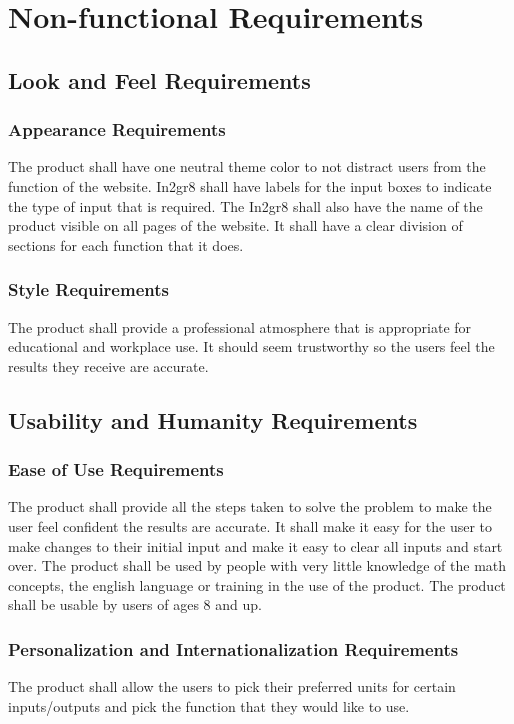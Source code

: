 \documentclass[11pt, oneside]{article}
\begin{document}
\newpage
\section{Non-functional Requirements}
\subsection{Look and Feel Requirements}
\subsubsection{Appearance Requirements}
The product shall have one neutral theme color to not distract users from the function of the website. In2gr8 shall have labels for the input boxes to indicate the type of input that is required. The In2gr8 shall also have the name of the product visible on all pages of the website. It shall have a clear division of sections for each function that it does.




\subsubsection{Style Requirements}
The product shall provide a professional atmosphere that is appropriate for educational and workplace use. It should seem trustworthy so the users feel the results they receive are accurate.




\subsection{Usability and Humanity Requirements}
\subsubsection{Ease of Use Requirements}
The product shall provide all the steps taken to solve the problem to make the user feel confident the results are accurate. It shall make it easy for the user to make changes to their initial input and make it easy to clear all inputs and start over. The product shall be used by people with very little knowledge of the math concepts, the english language or training in the use of the product. The product shall be usable by users of ages 8 and up.


\subsubsection{Personalization and Internationalization Requirements}
The product shall allow the users to pick their preferred units for certain inputs/outputs and pick the function that they would like to use.
\end{document}
